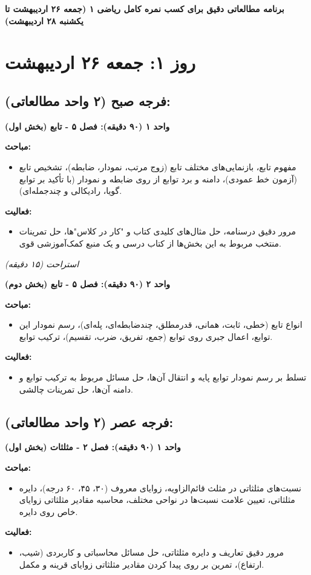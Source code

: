 \documentclass[12pt,a4paper]{article}
\newcommand{\studyunit}[1]{\par\medskip\noindent\textbf{#1}\par\nopagebreak}
\newcommand{\topics}{\par\medskip\noindent\textbf{مباحث:}\begin{itemize}[nosep,after=\vspace{-0.5\baselineskip}]}
\newcommand{\activities}{\par\medskip\noindent\textbf{فعالیت:}\begin{itemize}[nosep,after=\vspace{-0.5\baselineskip}]}
\newcommand{\breaktime}[1]{\par\smallskip\centerline{\textit{#1}}\smallskip}
\begin{document}
\begin{center}
\Large\textbf{برنامه مطالعاتی دقیق برای کسب نمره کامل ریاضی ۱ (جمعه ۲۶ اردیبهشت تا یکشنبه ۲۸ اردیبهشت)}
\end{center}
\hrulefill
\vspace{1em}

\section*{روز ۱: جمعه ۲۶ اردیبهشت}

\subsection*{فرجه صبح (۲ واحد مطالعاتی):}
    \studyunit{واحد ۱ (۹۰ دقیقه): فصل ۵ - تابع (بخش اول)}
        \topics
            \item مفهوم تابع، بازنمایی‌های مختلف تابع (زوج مرتب، نمودار، ضابطه)، تشخیص تابع (آزمون خط عمودی)، دامنه و برد توابع از روی ضابطه و نمودار (با تأکید بر توابع گویا، رادیکالی و چندجمله‌ای).
        \end{itemize}
        \activities
            \item مرور دقیق درسنامه، حل مثال‌های کلیدی کتاب و "کار در کلاس"ها، حل تمرینات منتخب مربوط به این بخش‌ها از کتاب درسی و یک منبع کمک‌آموزشی قوی.
        \end{itemize}

    \breaktime{استراحت (۱۵ دقیقه)}

    \studyunit{واحد ۲ (۹۰ دقیقه): فصل ۵ - تابع (بخش دوم)}
        \topics
            \item انواع تابع (خطی، ثابت، همانی، قدرمطلق، چندضابطه‌ای، پله‌ای)، رسم نمودار این توابع، اعمال جبری روی توابع (جمع، تفریق، ضرب، تقسیم)، ترکیب توابع.
        \end{itemize}
        \activities
            \item تسلط بر رسم نمودار توابع پایه و انتقال آن‌ها، حل مسائل مربوط به ترکیب توابع و دامنه آن‌ها، حل تمرینات چالشی.
        \end{itemize}

\subsection*{فرجه عصر (۲ واحد مطالعاتی):}
    \studyunit{واحد ۱ (۹۰ دقیقه): فصل ۲ - مثلثات (بخش اول)}
        \topics
            \item نسبت‌های مثلثاتی در مثلث قائم‌الزاویه، زوایای معروف (۳۰، ۴۵، ۶۰ درجه)، دایره مثلثاتی، تعیین علامت نسبت‌ها در نواحی مختلف، محاسبه مقادیر مثلثاتی زوایای خاص روی دایره.
        \end{itemize}
        \activities
            \item مرور دقیق تعاریف و دایره مثلثاتی، حل مسائل محاسباتی و کاربردی (شیب، ارتفاع)، تمرین بر روی پیدا کردن مقادیر مثلثاتی زوایای قرینه و مکمل.
        \end{itemize}
\end{document}
